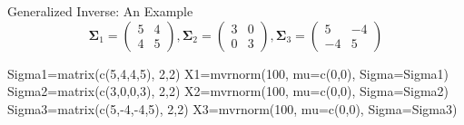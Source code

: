 \documentclass[
  ignorenonframetext,
]{beamer}
\newenvironment{Shaded}{\begin{snugshade}}{\end{snugshade}}
\newcommand{\AttributeTok}[1]{\textcolor[rgb]{0.77,0.63,0.00}{#1}}
\newcommand{\DecValTok}[1]{\textcolor[rgb]{0.00,0.00,0.81}{#1}}
\newcommand{\FunctionTok}[1]{\textcolor[rgb]{0.00,0.00,0.00}{#1}}
\newcommand{\NormalTok}[1]{#1}
\newcommand{\OtherTok}[1]{\textcolor[rgb]{0.56,0.35,0.01}{#1}}
\newcommand{\SpecialCharTok}[1]{\textcolor[rgb]{0.00,0.00,0.00}{#1}}
\begin{document}
\begin{frame}[fragile]{Generalized Inverse: An Example}
\protect\hypertarget{generalized-inverse-an-example}{}
\[
\boldsymbol \Sigma_1=\begin{pmatrix}5 &4 \\ 4 &5\end{pmatrix},
\boldsymbol \Sigma_2=\begin{pmatrix}3 &0 \\ 0 &3\end{pmatrix},
\boldsymbol \Sigma_3=\begin{pmatrix}5 &-4 \\ -4 &5\end{pmatrix}
\]

\begin{Shaded}
\begin{Highlighting}[]
\NormalTok{Sigma1}\OtherTok{=}\FunctionTok{matrix}\NormalTok{(}\FunctionTok{c}\NormalTok{(}\DecValTok{5}\NormalTok{,}\DecValTok{4}\NormalTok{,}\DecValTok{4}\NormalTok{,}\DecValTok{5}\NormalTok{), }\DecValTok{2}\NormalTok{,}\DecValTok{2}\NormalTok{) }
\NormalTok{X1}\OtherTok{=}\FunctionTok{mvrnorm}\NormalTok{(}\DecValTok{100}\NormalTok{, }\AttributeTok{mu=}\FunctionTok{c}\NormalTok{(}\DecValTok{0}\NormalTok{,}\DecValTok{0}\NormalTok{), }\AttributeTok{Sigma=}\NormalTok{Sigma1)}
\NormalTok{Sigma2}\OtherTok{=}\FunctionTok{matrix}\NormalTok{(}\FunctionTok{c}\NormalTok{(}\DecValTok{3}\NormalTok{,}\DecValTok{0}\NormalTok{,}\DecValTok{0}\NormalTok{,}\DecValTok{3}\NormalTok{), }\DecValTok{2}\NormalTok{,}\DecValTok{2}\NormalTok{)}
\NormalTok{X2}\OtherTok{=}\FunctionTok{mvrnorm}\NormalTok{(}\DecValTok{100}\NormalTok{, }\AttributeTok{mu=}\FunctionTok{c}\NormalTok{(}\DecValTok{0}\NormalTok{,}\DecValTok{0}\NormalTok{), }\AttributeTok{Sigma=}\NormalTok{Sigma2)}
\NormalTok{Sigma3}\OtherTok{=}\FunctionTok{matrix}\NormalTok{(}\FunctionTok{c}\NormalTok{(}\DecValTok{5}\NormalTok{,}\SpecialCharTok{{-}}\DecValTok{4}\NormalTok{,}\SpecialCharTok{{-}}\DecValTok{4}\NormalTok{,}\DecValTok{5}\NormalTok{), }\DecValTok{2}\NormalTok{,}\DecValTok{2}\NormalTok{)}
\NormalTok{X3}\OtherTok{=}\FunctionTok{mvrnorm}\NormalTok{(}\DecValTok{100}\NormalTok{, }\AttributeTok{mu=}\FunctionTok{c}\NormalTok{(}\DecValTok{0}\NormalTok{,}\DecValTok{0}\NormalTok{), }\AttributeTok{Sigma=}\NormalTok{Sigma3)}
\end{Highlighting}
\end{Shaded}
\end{frame}
\end{document}
